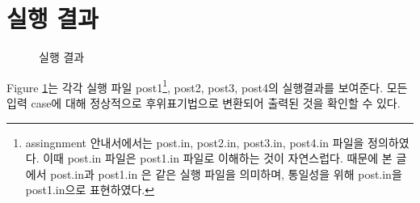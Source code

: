 \documentclass{article}
\begin{document}
\section{실행 결과}
\begin{figure} [ht]
    \begin{center}
    \caption{실행 결과}
    \label{fig:test result}
    \end{center}
\end{figure}
Figure \ref{fig:test result}는 각각 실행 파일 post1\footnote{assingnment 안내서에서는 post.in, post2.in, post3.in, post4.in 파일을 정의하였다. 이때 post.in 파일은 post1.in 파일로 이해하는 것이 자연스럽다. 때문에 본 글에서 post.in과 post1.in 은 같은 실행 파일을 의미하며, 통일성을 위해 post.in을 post1.in으로 표현하였다.}, post2, post3, post4의 실행결과를 보여준다. 모든 입력 case에 대해 정상적으로 후위표기법으로 변환되어 출력된 것을 확인할 수 있다.
\end{document}
